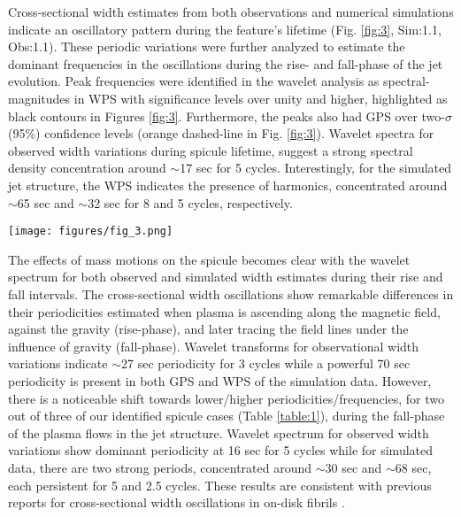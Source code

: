 Cross-sectional width estimates from both observations and numerical simulations indicate an oscillatory pattern during the feature’s lifetime (Fig. \ref{fig:3}, Sim:1.1, Obs:1.1). These periodic variations were further analyzed to estimate the dominant frequencies in the oscillations during the rise- and fall-phase of the jet evolution. Peak frequencies were identified in the wavelet analysis as spectral-magnitudes in WPS with significance levels over unity and higher, highlighted as black contours in Figures \ref{fig:3}. Furthermore, the peaks also had GPS over two-$\sigma$ (95\%) confidence levels (orange dashed-line in Fig. \ref{fig:3}). Wavelet spectra for observed width variations during spicule lifetime, suggest a strong spectral density concentration around $\sim$17 sec for 5 cycles. Interestingly, for the simulated jet structure, the WPS indicates the presence of harmonics, concentrated around $\sim$65 sec and $\sim$32 sec for 8 and 5 cycles, respectively. 

\begin{figure*}
\texttt{[image: figures/fig\_3.png]}
\caption{Panels showing the results of spectral analysis of cross-sectional width estimates of observed (top) and simulated (bottom) jet structures. Each panel depicts for temporal evolution of overall widths (1.1) and subsequent rise- (2.1) and fall-phases (3.1), along with Wavelet Power Spectra (WPS: 1.2, 2.2, 3.2) and Global Power Spectra (GPS: 1.3, 2.3, 3.3) during each phase of the evolution of the jet. Vertical red-line in plots (Obs: 1.1 and Sim 1.1) marks the time when the field-aligned plasma attained the apex height. Further, plots (Obs: 1.1, Sim: 3.2) provide clear indication of a second harmonic of the sausage waves confined in the dynamic spicular waveguide.}
\label{fig:3} 
\end{figure*}

The effects of mass motions on the spicule becomes clear with the wavelet spectrum for both observed and simulated width estimates during their rise and fall intervals. The cross-sectional width oscillations show remarkable differences in their periodicities estimated when plasma is ascending along the magnetic field, against the gravity (rise-phase), and later tracing the field lines under the influence of gravity (fall-phase). Wavelet transforms for observational width variations indicate $\sim$27 sec periodicity for 3 cycles while a powerful 70 sec periodicity is present in both GPS and WPS of the simulation data. However, there is a noticeable shift towards lower/higher periodicities/frequencies, for two out of three of our identified spicule cases (Table \ref{table:1}), during the fall-phase of the plasma flows in the jet structure. Wavelet spectrum for observed width variations show dominant periodicity at 16 sec for 5 cycles while for simulated data, there are two strong periods, concentrated around $\sim$30 sec and $\sim$68 sec, each persistent for 5 and 2.5 cycles. These results are consistent with previous reports for cross-sectional width oscillations in on-disk fibrils \citep{Gafeira2017}. 

